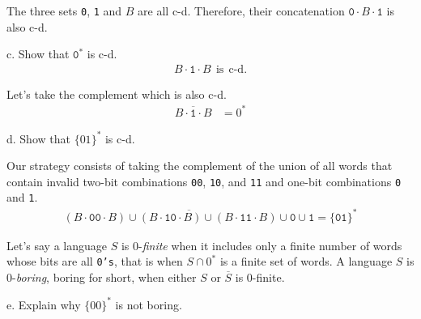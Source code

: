 \documentclass[12pt]{article}
\begin{document}
\par{The three sets \texttt{0}, \texttt{1} and $B$ are all c-d. Therefore, their concatenation $\texttt{0} \cdot B \cdot \texttt{1}$ is also c-d.} 
\par{c. Show that $\texttt{0}^*$ is c-d.}
\begin{align*}
B \cdot \texttt{1} \cdot B\:\:\text{is}\:\:\text{c-d}.
\end{align*}
\par{Let's take the complement which is also c-d.}
\begin{align*}
\overline{B \cdot \texttt{1} \cdot B} &= 0^*
\end{align*}
\par{d. Show that $\{01\}^*$ is c-d.}
\par{Our strategy consists of taking the complement of the union of all words that contain invalid two-bit combinations \texttt{00}, \texttt{10}, and \texttt{11} and one-bit combinations \texttt{0} and \texttt{1}.}
\begin{align*}
\overline{(B \cdot \texttt{00} \cdot B) \cup (B \cdot \texttt{10} \cdot B) \cup (B \cdot \texttt{11} \cdot B) \cup \texttt{0} \cup \texttt{1}} = \{\texttt{01}\}^*
\end{align*}
\par{Let's say a language $S$ is 0-\emph{finite} when it includes only a finite number of words whose bits are all \texttt{0's}, that is when $S \cap 0^*$ is a finite set of words. A language $S$ is 0-\emph{boring}, boring for short, when either $S$ or $\overline{S}$ is 0-finite.}
\par{e. Explain why $\{00\}^*$ is not boring.}
\end{document}
